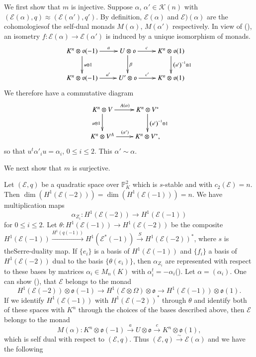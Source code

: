 We first show that $m$ is injective. Suppose $\alpha$, $\alpha'\in \mathscr{K}(n)$ with $(\mathscr{E}(\alpha),q)\approx (\mathscr{E}(\alpha'),q')$. By definition, $\mathscr{E}(\alpha)$ and $\mathscr{E})(\alpha)$ are the cohomologies\pageoriginale of the self-dual monads $M(\alpha)$, $M(\alpha')$ respectively. In view of (\cite[prop. 4]{key2}), an isometry $f:\mathscr{E}(\alpha)\to \mathscr{E}(\alpha')$ is induced by a unique isomorphism of monads.
$$
\xymatrix{K^{n}\otimes\ar[d]^{u\otimes 1} \mathfrak{o}(-1)\ar[r]^-{a}&U\otimes\ar[d]^{\beta} \mathfrak{o}\ar[r]^-{c}&K^{n}\otimes\ar[d]^{\left(u^{t}\right)^{-1}\otimes 1} \mathfrak{o}(1)\\
K^{n}\otimes \mathfrak{o}(-1)\ar[r]^-{a'}&U'\otimes\mathfrak{o}\ar[r]^-{c'}& K^{n}\otimes \mathfrak{o}(1)}
$$
We therefore have a commutative diagram 
$$
\xymatrix{K^{n}\otimes V\ar[d]_{u\otimes 1}\ar[r]^{A(\alpha)}&K^{n}\otimes\ar[d]^{\left(u^{t}\right)^{-1}\otimes 1} V^{\ast}\\
K^{n}\otimes V^{A}\ar[r]^{\left(\alpha'\right)}&K^{n}\otimes V^{\ast},}
$$
so that $u^{t}\alpha'_iu=\alpha_i$, $0\leq i\leq 2$. This $\alpha'\sim\alpha$. 

We next show that $m$ is surjective.

Let $(\mathscr{E},q)$ be a quadratic space over $\mathbb{P}^{2}_K$ which is $s$-stable and with $c_2(\mathscr{E})=n$. Then $\dim \left(H^{1}(\mathscr{E}(-2))\right)=\dim \left(H^{1}(\mathscr{E}(-1))\right)=n$. We have multiplication maps 
$$
\alpha_{Z_{i}}:H^{1}(\mathscr{E}(-2))\to H^{1}(\mathscr{E}(-1))
$$
for $0\leq i \leq 2$. Let $\theta:H^{1}(\mathscr{E}(-1))\to H^{1}(\mathscr{E}(-2))$ be the composite $H^{1}(\mathscr{E}(-1))\xrightarrow{H^{1}(q(-1))}H^{1}\left(\mathscr{E}^{\ast}(-1)\right)\xrightarrow{S}H^{1}(\mathscr{E}(-2))^{\ast}$, where $s$ is the\pageoriginale Serre-duality map. If $\{e_i\}$ is a basis of  $H^{1}(\mathscr{E}(-1))$ and $\{f_i\}$ a basis of $H^{1}(\mathscr{E}(-2))$ dual to the basis $\{\theta(e_i)\}$, then $\alpha_{Z_{i}}$ are represented with respect to these bases by matrices $\alpha_i\in M_n(K)$ with $\alpha^{t}_i=-\alpha_i$(\cite[Th.20]{key8}). Let $\alpha=(\alpha_i)$. One can show (\cite[Proof of theorem 1.5.2]{key4}), that $\mathscr{E}$ belongs to the monad 
$$
H^{1}(\mathscr{E}(-2))\otimes \mathfrak{o}(-1)\to H^{1}(\mathscr{E}\otimes \Omega)\otimes \mathfrak{o}\to H^{1}(\mathscr{E}(-1))\otimes\mathfrak{o}(1). 
$$
If we identify  $H^{1}(\mathscr{E}(-1))$ with $H^{1}(\mathscr{E}(-2))^{\ast}$ through $\theta$ and identify both of these spaces with $K^{n}$ through the choices of the bases described above, then $\mathscr{E}$ belongs to the monad 
$$
M(\alpha):K^{n}\otimes \mathfrak{o}(-1)\xrightarrow{a}U\otimes\mathfrak{o}\xrightarrow{c}K^{n}\otimes \mathfrak{o}(1), 
$$
which is self dual with respect to $(\mathscr{E},q)$. Thus $(\mathscr{E},q)\xrightarrow{\sim}\mathscr{E}(\alpha)$ and we have the following 

